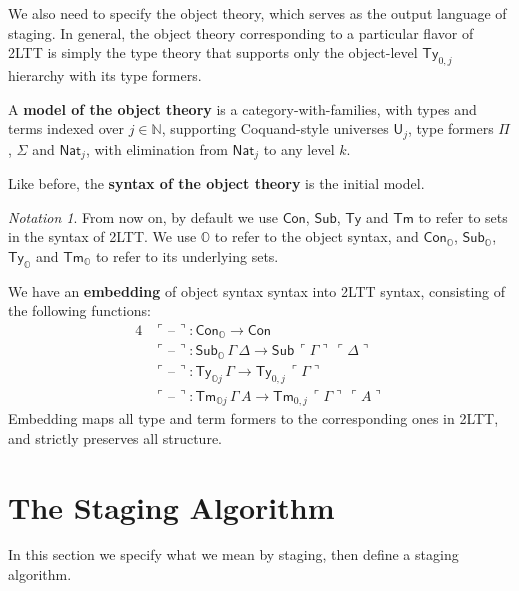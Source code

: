 \documentclass[acmsmall]{acmart}
\newcommand{\msf}[1]{\mathsf{#1}}
\newcommand{\mbb}[1]{\mathbb{#1}}
\newcommand{\mbbo}{\mbb{O}}
\newcommand{\ob}{_\mbbo}
\renewcommand{\U}{\msf{U}}
\newcommand{\Con}{\msf{Con}}
\newcommand{\Sub}{\msf{Sub}}
\newcommand{\Ty}{\msf{Ty}}
\newcommand{\Tm}{\msf{Tm}}
\newcommand{\Nat}{\msf{Nat}}
\newcommand{\blank}{{\mathord{\hspace{1pt}\text{--}\hspace{1pt}}}}
\newcommand{\emb}[1]{\ulcorner#1\urcorner}
\theoremstyle{remark}
\newtheorem{notation}{Notation}
\begin{document}
We also need to specify the object theory, which serves as the output language
of staging. In general, the object theory corresponding to a particular flavor
of 2LTT is simply the type theory that supports only the object-level $\Ty_{0,j}$
hierarchy with its type formers.

\begin{definition}
A \textbf{model of the object theory} is a category-with-families, with types and
terms indexed over $j \in \mbb{N}$, supporting Coquand-style universes $\U_j$,
type formers $\Pi$, $\Sigma$ and $\Nat_j$, with elimination from $\Nat_j$ to
any level $k$.
\end{definition}

\begin{definition}
Like before, the \textbf{syntax of the object theory} is the initial model.
\end{definition}

\begin{notation}
From now on, by default we use $\Con$, $\Sub$, $\Ty$ and $\Tm$ to refer to sets
in the syntax of 2LTT. We use $\mbbo$ to refer to the object syntax, and
$\Con\ob$, $\Sub\ob$, $\Ty\ob$ and $\Tm\ob$ to refer to its underlying sets.
\end{notation}

\begin{definition}
We have an \textbf{embedding} of object syntax syntax into 2LTT syntax, consisting
of the following functions:
\begin{alignat*}{4}
  & \emb{\blank} : \Con\ob \to \Con\\
  & \emb{\blank} : \Sub\ob\,\Gamma\,\Delta \to \Sub\,\emb{\Gamma}\,\emb{\Delta}\\
  & \emb{\blank} : \Ty_{\mbbo j}\,\Gamma \to \Ty_{0,j}\,\emb{\Gamma}\\
  & \emb{\blank} : \Tm_{\mbbo j}\,\Gamma\,A \to \Tm_{0,j}\,\emb{\Gamma}\,\emb{A}
\end{alignat*}
Embedding maps all type and term formers to the corresponding ones in 2LTT, and
strictly preserves all structure.
\end{definition}

\section{The Staging Algorithm}

In this section we specify what we mean by staging, then define a staging
algorithm.
\end{document}
